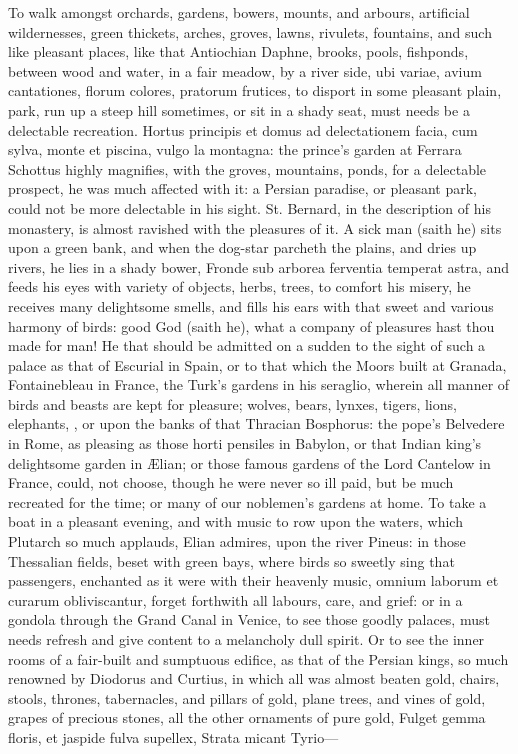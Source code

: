 {To walk amongst orchards, gardens, bowers, mounts, and arbours,
artificial wildernesses, green thickets, arches, groves, lawns,
rivulets, fountains, and such like pleasant places, like that
Antiochian Daphne, brooks, pools, fishponds, between wood and water, in
a fair meadow, by a river side, ubi variae, avium cantationes,
florum colores, pratorum frutices, \etc{} to disport in some pleasant
plain, park, run up a steep hill sometimes, or sit in a shady seat,
must needs be a delectable recreation. Hortus principis et domus ad
delectationem facia, cum sylva, monte et piscina, vulgo la montagna:
the prince's garden at Ferrara Schottus highly magnifies, with
the groves, mountains, ponds, for a delectable prospect, he was much
affected with it: a Persian paradise, or pleasant park, could not be
more delectable in his sight. St. Bernard, in the description of his
monastery, is almost ravished with the pleasures of it. A sick
man (saith he) sits upon a green bank, and when the dog-star
parcheth the plains, and dries up rivers, he lies in a shady bower,
Fronde sub arborea ferventia temperat astra, and feeds his eyes with
variety of objects, herbs, trees, to comfort his misery, he receives
many delightsome smells, and fills his ears with that sweet and various
harmony of birds: good God (saith he), what a company of pleasures hast
thou made for man! He that should be admitted on a sudden to the sight
of such a palace as that of Escurial in Spain, or to that which the
Moors built at Granada, Fontainebleau in France, the Turk's gardens in
his seraglio, wherein all manner of birds and beasts are kept for
pleasure; wolves, bears, lynxes, tigers, lions, elephants, \etc{}, or upon
the banks of that Thracian Bosphorus: the pope's Belvedere in Rome,
as pleasing as those horti pensiles in Babylon, or that Indian
king's delightsome garden in \AE{}lian; or those famous
gardens of the Lord Cantelow in France, could, not choose, though he
were never so ill paid, but be much recreated for the time; or many of
our noblemen's gardens at home. To take a boat in a pleasant evening,
and with music to row upon the waters, which Plutarch so much
applauds, Elian admires, upon the river Pineus: in those Thessalian
fields, beset with green bays, where birds so sweetly sing that
passengers, enchanted as it were with their heavenly music, omnium
laborum et curarum obliviscantur, forget forthwith all labours, care,
and grief: or in a gondola through the Grand Canal in Venice, to see
those goodly palaces, must needs refresh and give content to a
melancholy dull spirit. Or to see the inner rooms of a fair-built and
sumptuous edifice, as that of the Persian kings, so much renowned by
Diodorus and Curtius, in which all was almost beaten gold,
chairs, stools, thrones, tabernacles, and pillars of gold, plane
trees, and vines of gold, grapes of precious stones, all the other
ornaments of pure gold,
Fulget gemma floris, et jaspide fulva supellex,
Strata micant Tyrio---

}
